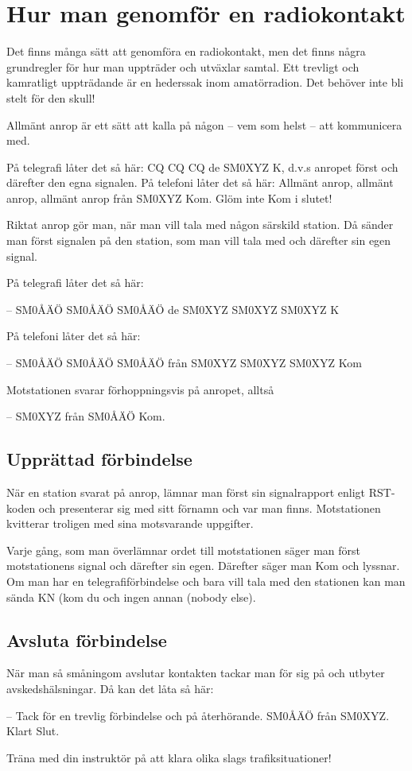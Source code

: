 
\section{Hur man genomför en radiokontakt}

Det finns många sätt att genomföra en radiokontakt, men det finns
några grundregler för hur man uppträder och utväxlar samtal. Ett
trevligt och kamratligt uppträdande är en hederssak inom
amatörradion. Det behöver inte bli stelt för den skull!

Allmänt anrop är ett sätt att kalla på någon
-- vem som helst -- att kommunicera med.

På telegrafi låter det så här: CQ CQ CQ de SM0XYZ K, d.v.s anropet
först och därefter den egna signalen. På telefoni låter det så här:
Allmänt anrop, allmänt anrop, allmänt anrop från SM0XYZ Kom. Glöm inte
Kom i slutet!

Riktat anrop gör man, när man vill tala med någon särskild station. Då
sänder man först signalen på den station, som man vill tala med och
därefter sin egen signal.

På telegrafi låter det så här:

-- SM0ÅÄÖ SM0ÅÄÖ SM0ÅÄÖ de SM0XYZ SM0XYZ SM0XYZ K

På telefoni låter det så här:

-- SM0ÅÄÖ SM0ÅÄÖ SM0ÅÄÖ från SM0XYZ SM0XYZ SM0XYZ Kom

Motstationen svarar förhoppningsvis på anropet, alltså

-- SM0XYZ från SM0ÅÄÖ Kom.

\subsection{Upprättad förbindelse}

När en station svarat på anrop, lämnar man först sin signalrapport
enligt RST-koden och presenterar sig med sitt förnamn och var man
finns. Motstationen kvitterar troligen med sina motsvarande
uppgifter.

Varje gång, som man överlämnar ordet till motstationen
säger man först motstationens signal och därefter sin egen. Därefter
säger man Kom och lyssnar. Om man har en telegrafiförbindelse och bara
vill tala med den stationen kan man sända KN (kom du och ingen annan
(nobody else).

\subsection{Avsluta förbindelse}

När man så småningom avslutar kontakten tackar man för sig på och
utbyter avskedshälsningar. Då kan det låta så här:

-- Tack för en trevlig förbindelse och på återhörande. SM0ÅÄÖ från
SM0XYZ. Klart Slut.

Träna med din instruktör på att klara olika slags trafiksituationer!
